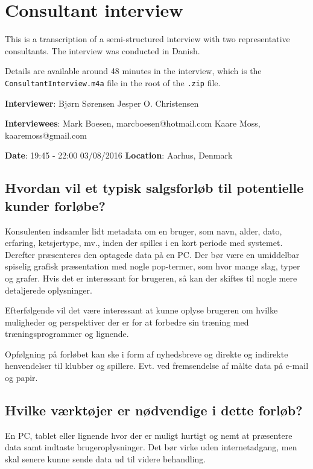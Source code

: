\chapter{Consultant interview}
\label{ch:consultantsInterview}
This is a transcription of a semi-structured interview with two representative consultants.
The interview was conducted in Danish.

Details are available around 48 minutes in the interview, which is the \verb+ConsultantInterview.m4a+ file in the root of the \verb+.zip+ file.


\textbf{Interviewer}: \newline
Bjørn Sørensen \newline
Jesper O. Christensen

\textbf{Interviewees}: \newline 
Mark Boesen, marcboesen@hotmail.com \newline
Kaare Moss, kaaremoss@gmail.com

\textbf{Date}: 19:45 - 22:00 03/08/2016 \newline
\textbf{Location}: Aarhus, Denmark

\section{Hvordan vil et typisk salgsforløb til potentielle kunder forløbe?}
\label{ch:consultantsInterview:flow}
Konsulenten indsamler lidt metadata om en bruger, som navn, alder, dato, erfaring, ketsjertype, mv., inden der spilles i en kort periode med systemet. 
Derefter præsenteres den optagede data på en PC. 
Der bør være en umiddelbar spiselig grafisk præsentation med nogle pop-termer, som hvor mange slag, typer og grafer.
Hvis det er interessant for brugeren, så kan der skiftes til nogle mere detaljerede oplysninger.

Efterfølgende vil det være interessant at kunne oplyse brugeren om hvilke muligheder og perspektiver der er for at forbedre sin træning med træningsprogrammer og lignende.

Opfølgning på forløbet kan ske i form af nyhedsbreve og direkte og indirekte henvendelser til klubber og spillere.
Evt. ved fremsendelse af målte data på e-mail og papir.

\section{Hvilke værktøjer er nødvendige i dette forløb?}
\label{ch:consultantsInterview:tools}
En PC, tablet eller lignende hvor der er muligt hurtigt og nemt at præsentere data samt indtaste brugeroplysninger.
Det bør virke uden internetadgang, men skal senere kunne sende data ud til videre behandling.

